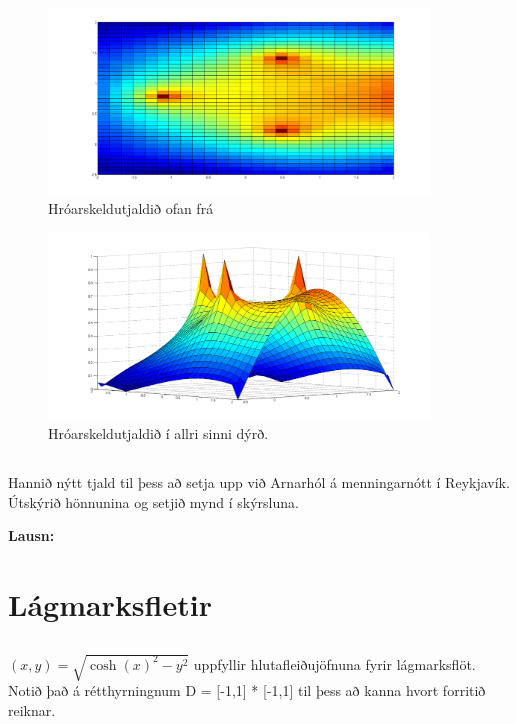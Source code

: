 \documentclass[11pt,a4paper,titlepage]{article}
\begin{document}
 \begin{figure}[h!]
     \centering
     \includegraphics[width=0.9\textwidth]{hroarskelda_top.png}
     \caption{Hróarskeldutjaldið ofan frá }
     \label{fig:awesome_image10}
 \end{figure}
 
  \begin{figure}[h!]
      \centering
      \includegraphics[width=0.9\textwidth]{hroarskelda_party.png}
      \caption{Hróarskeldutjaldið í allri sinni dýrð.}
      \label{fig:awesome_image11}
  \end{figure}
  \newpage
  
  
 \subsection{}
 Hannið nýtt tjald til þess að setja upp við Arnarhól á menningarnótt í Reykjavík. Útskýrið hönnunina og setjið mynd í skýrsluna.
 
 \par
 \textbf{Lausn:}\par
 
 
 
\section{Lágmarksfletir}

\subsection{}
$(x,y)= \sqrt{\cosh (x)^{2}-y^{2}}$  uppfyllir hlutafleiðujöfnuna fyrir lágmarksflöt. Notið það á rétthyrningnum D = [-1,1] * [-1,1] til þess að kanna hvort forritið reiknar.
\end{document}

